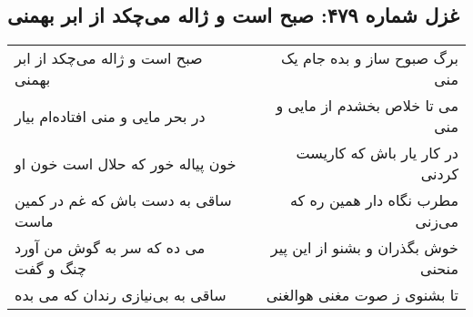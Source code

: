 \begin{center}
\section*{غزل شماره ۴۷۹: صبح است و ژاله می‌چکد از ابر بهمنی}
\label{sec:sh479}
\begin{longtable}{l p{0.5cm} r}
صبح است و ژاله می‌چکد از ابر بهمنی
&&
برگ صبوح ساز و بده جام یک منی
\\
در بحر مایی و منی افتاده‌ام بیار
&&
می تا خلاص بخشدم از مایی و منی
\\
خون پیاله خور که حلال است خون او
&&
در کار یار باش که کاریست کردنی
\\
ساقی به دست باش که غم در کمین ماست
&&
مطرب نگاه دار همین ره که می‌زنی
\\
می ده که سر به گوش من آورد چنگ و گفت
&&
خوش بگذران و بشنو از این پیر منحنی
\\
ساقی به بی‌نیازی رندان که می بده
&&
تا بشنوی ز صوت مغنی هوالغنی
\\
\end{longtable}
\end{center}
